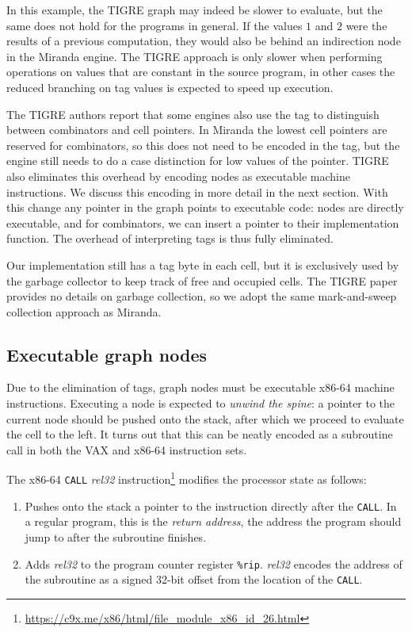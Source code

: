 \documentclass[conference]{IEEEtran}
\begin{document}
In this example, the TIGRE graph may indeed be slower to evaluate, but the same does not hold for the programs in general.
If the values $1$ and $2$ were the results of a previous computation, they would also be behind an indirection node in the Miranda engine.
The TIGRE approach is only slower when performing operations on values that are constant in the source program, in other cases the reduced branching on tag values is expected to speed up execution.

The TIGRE authors report that some engines also use the tag to distinguish between combinators and cell pointers.
In Miranda the lowest cell pointers are reserved for combinators, so this does not need to be encoded in the tag, but the engine still needs to do a case distinction for low values of the pointer.
TIGRE also eliminates this overhead by encoding nodes as executable machine instructions.
We discuss this encoding in more detail in the next section.
With this change any pointer in the graph points to executable code: nodes are directly executable, and for combinators, we can insert a pointer to their implementation function.
The overhead of interpreting tags is thus fully eliminated.

Our implementation still has a tag byte in each cell, but it is exclusively used by the garbage collector to keep track of free and occupied cells.
The TIGRE paper provides no details on garbage collection, so we adopt the same mark-and-sweep collection approach as Miranda.

\subsection{Executable graph nodes}
Due to the elimination of tags, graph nodes must be executable x86-64 machine instructions.
Executing a node is expected to \emph{unwind the spine}: a pointer to the current node should be pushed onto the stack, after which we proceed to evaluate the cell to the left.
It turns out that this can be neatly encoded as a subroutine call in both the VAX and x86-64 instruction sets.

The x86-64 \texttt{CALL} \textit{rel32} instruction\footnote{\url{https://c9x.me/x86/html/file_module_x86_id_26.html}} modifies the processor state as follows:
\begin{enumerate}
    \item Pushes onto the stack a pointer to the instruction directly after the \texttt{CALL}.
          In a regular program, this is the \emph{return address}, the address the program should jump to after the subroutine finishes.
    \item Adds \textit{rel32} to the program counter register \texttt{\%rip}.
          \textit{rel32} encodes the address of the subroutine as a signed 32-bit offset from the location of the \texttt{CALL}.
\end{enumerate}
\end{document}
